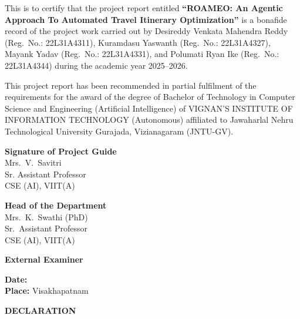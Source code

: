 \documentclass[12pt,a4paper]{report}
\begin{document}
This is to certify that the project report entitled \textbf{``ROAMEO: An Agentic Approach To Automated Travel Itinerary Optimization''} is a bonafide record of the project work carried out by Desireddy Venkata Mahendra Reddy (Reg.\ No.: 22L31A4311), Kuramdasu Yaswanth (Reg.\ No.: 22L31A4327), Mayank Yadav (Reg.\ No.: 22L31A4331), and Polumati Ryan Ike (Reg.\ No.: 22L31A4344) during the academic year 2025--2026.

This project report has been recommended in partial fulfilment of the requirements for the award of the degree of Bachelor of Technology in Computer Science and Engineering (Artificial Intelligence) of VIGNAN'S INSTITUTE OF INFORMATION TECHNOLOGY (Autonomous) affiliated to Jawaharlal Nehru Technological University Gurajada, Vizianagaram (JNTU-GV).

\vspace{1.5cm}

\begin{center}
\begin{minipage}[t]{0.42\textwidth}
\centering
\textbf{Signature of Project Guide}\\
Mrs.\ V.\ Savitri\\
Sr. Assistant Professor\\
CSE (AI), VIIT(A)
\end{minipage}
\hfill
\begin{minipage}[t]{0.42\textwidth}
\centering
\textbf{Head of the Department}\\
Mrs.\ K.\ Swathi (PhD)\\
Sr.\ Assistant Professor\\
CSE (AI), VIIT(A)
\end{minipage}
\end{center}

\vspace{1.5cm}
\begin{center}
\textbf{External Examiner}
\end{center}

\vspace{0.5cm}
\noindent\textbf{Date:}\\
\noindent\textbf{Place:} Visakhapatnam

\clearpage
\thispagestyle{certdeclplain}

\begin{center}
{\LARGE\bfseries DECLARATION}
\end{center}
\vspace{1cm}
\end{document}
